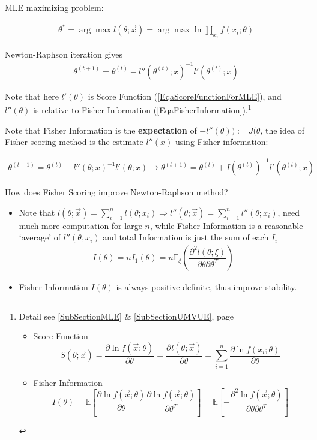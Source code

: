     MLE maximizing problem: 

\begin{align}
    \theta ^*=\arg\max l(\theta;\vec{x})=\arg\max \ln \prod_{x_i} f(x_i;\theta )
\end{align}

    Newton-Raphson iteration gives 
    \begin{align}
        \theta ^{(t+1)}=\theta ^{(t)}- l''(\theta^{(t)} ;x)^{-1}l'(\theta ^{(t)};x)
    \end{align}
    
    Note that here $ l'(\theta ) $ is Score Function (\autoref{EqaScoreFunctionForMLE}), and $ l''(\theta ) $ is relative to Fisher Information (\autoref{EqaFisherInformation}).\footnote{Detail see \autoref{SubSectionMLE} \& \autoref{SubSectionUMVUE}, page~\pageref{SubSectionUMVUE}
\begin{itemize}[topsep=2pt,itemsep=0pt]
    \item Score Function 
    \begin{equation}
        S(\theta;\vec{x})=\frac{\partial\ln f(\vec{x};\theta)}{\partial\theta}=\dfrac{\partial^{} l(\theta;\vec{x})}{\partial \theta^{}}=\sum_{i=1}^n\frac{\partial\ln f(x_i;\theta)}{\partial\theta}
    \end{equation}
    \item Fisher Information
    \begin{equation}
        I(\theta)=\mathbb{E}\left[\frac{\partial \ln f(\vec{x};\theta)}{\partial\theta}\frac{\partial \ln f(\vec{x};\theta)}{\partial\theta^T}\right]=\mathbb{E}\left[-\frac{\partial^2\ln f(\vec{x};\theta)}{\partial \theta\partial \theta^T}\right]
    \end{equation}
\end{itemize}}

    Note that Fisher Information is the \textbf{expectation}  of $-l''(\theta ) ):=J(\theta  $, the idea of Fisher scoring method is the estimate $ l''(x) $ using Fisher information:

    \begin{align}
        \theta ^{(t+1)}=\theta ^{(t)}- l''(\theta ;x)^{-1}l'(\theta ;x)\longrightarrow \theta ^{(t+1)}=\theta ^{(t)}+I(\theta^{(t)} )^{-1}l'(\theta^{(t)} ;x)
    \end{align}

    How does Fisher Scoring improve Newton-Raphson method? 
\begin{itemize}[topsep=2pt,itemsep=0pt]
    \item Note that $ l(\theta ;\vec{x})=\sum_{i=1}^n l(\theta ;x_i)\Rightarrow l''(\theta ;\vec{x})=\sum_{i=1}^n l''(\theta ;x_i) $, need much more computation for large $ n $, while Fisher Information is a reasonable `average' of $ l''(\theta ,x_i) $ and total Information is just the sum of each $ I_i $
    \begin{align}
        I(\theta )=nI_{1}(\theta )=n\mathbb{E}_\xi (\dfrac{\partial^{2} l(\theta ;\xi )}{\partial \theta \partial \theta ^T}) 
    \end{align}
    \item Fisher Information $ I(\theta ) $ is always positive definite, thus improve stability.
\end{itemize}

